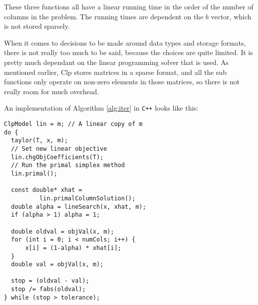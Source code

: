 These three functions all have a linear running time in the order of the number
of columns in the problem. The running times are dependent on the $b$ vector,
which is not stored sparsely.

When it comes to decisions to be made around data types and storage formats,
there is not really too much to be said, because the choices are quite limited.
It is pretty much dependant on the linear programming solver that is used.
As mentioned earlier, Clp stores matrices in a sparse format, and all the sub
functions only operate on non-zero elements in those matrices, so there is not
really room for much overhead.

An implementation of Algorithm \ref{alg:iter} in \texttt{C++} looks like this:
\begin{verbatim}
ClpModel lin = m; // A linear copy of m
do {
  taylor(T, x, m);
  // Set new linear objective
  lin.chgObjCoefficients(T);
  // Run the primal simplex method
  lin.primal();

  const double* xhat = 
          lin.primalColumnSolution();
  double alpha = lineSearch(x, xhat, m);
  if (alpha > 1) alpha = 1;

  double oldval = objVal(x, m);
  for (int i = 0; i < numCols; i++) {
      x[i] = (1-alpha) * xhat[i];
  }
  double val = objVal(x, m);

  stop = (oldval - val);
  stop /= fabs(oldval);
} while (stop > tolerance);
\end{verbatim}
